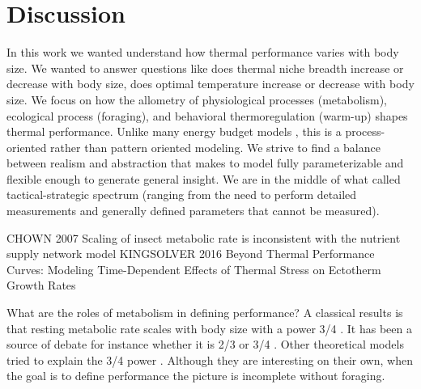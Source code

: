 \section*{Discussion}
In this work we wanted understand how thermal performance varies with body size.
We wanted to answer questions like does thermal niche breadth increase or decrease with body size, does optimal temperature increase or decrease with body size.
We focus on how the allometry of physiological processes (metabolism), ecological process (foraging), and behavioral thermoregulation (warm-up) shapes thermal performance. 
Unlike many energy budget models \citep[e.g.,][]{Brown1993,Kooijmann2009}, this is a process-oriented rather than pattern oriented modeling.
We strive to find a balance between realism and abstraction that makes to model fully parameterizable and flexible enough to generate general insight.
We are in the middle of what \citet{Hooling1966} called tactical-strategic spectrum (ranging from the need to perform detailed measurements and generally defined parameters that cannot be measured).

CHOWN 2007 Scaling of insect metabolic rate is inconsistent with the nutrient supply network model
KINGSOLVER 2016	Beyond Thermal Performance Curves: Modeling Time-Dependent Effects of Thermal Stress on Ectotherm Growth Rates

What are the roles of metabolism in defining performance?
A classical results is that resting metabolic rate scales with body size with a power 3/4  \citep{Kleiber1947, Peters1986, Brown2004}.
It has been a source of debate for instance whether it is 2/3 or 3/4 \citep[for refs][]{Yodzis1992, Isaac2010}.
Other theoretical models tried to explain the 3/4 power \citep[e.g.,][]{West1997, Kozlowski1997}.
Although they are interesting on their own, when the goal is to define performance the picture is incomplete without foraging.

